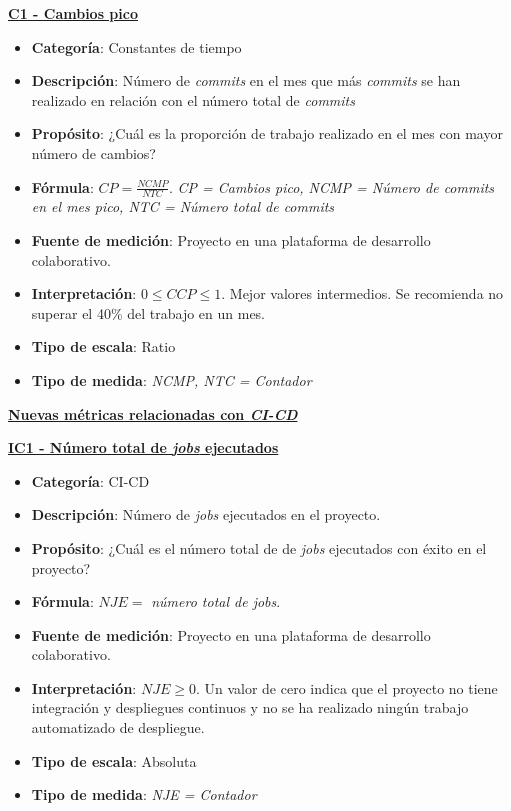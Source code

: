 \textbf{\underline{C1 - Cambios pico}}

\begin{itemize}
	\item \textbf{Categoría}: Constantes de tiempo
	\item \textbf{Descripción}: Número de \textit{commits} en el mes que más \textit{commits} se han realizado en relación con el número total de \textit{commits}
	\item \textbf{Propósito}: ¿Cuál es la proporción de trabajo realizado en el mes con mayor número de cambios?
	\item \textbf{Fórmula}: $CP = \frac{NCMP}{NTC}$. \textit{CP = Cambios pico, NCMP = Número de \textit{commits} en el mes pico, NTC = Número total de \textit{commits}}
	\item \textbf{Fuente de medición}: Proyecto en una plataforma de desarrollo colaborativo.
	\item \textbf{Interpretación}: $0 \leq CCP \leq 1$. Mejor valores intermedios. Se recomienda no superar el 40\% del trabajo en un mes.
	\item \textbf{Tipo de escala}: Ratio
	\item \textbf{Tipo de medida}: \textit{NCMP, NTC = Contador}
\end{itemize}

\begin{large}
\textbf{\underline{Nuevas métricas relacionadas con \textit{CI-CD}}}
\linebreak
\end{large}

\textbf{\underline{IC1 - Número total de \textit{jobs} ejecutados}}
\begin{itemize}
	\item \textbf{Categoría}: CI-CD
	\item \textbf{Descripción}: Número de \textit{jobs} ejecutados en el proyecto.
	\item \textbf{Propósito}: ¿Cuál es el número total de de \textit{jobs} ejecutados con éxito en el proyecto?
	\item \textbf{Fórmula}: $NJE =$ \textit{número total de jobs}.
	\item \textbf{Fuente de medición}: Proyecto en una plataforma de desarrollo colaborativo.
	\item \textbf{Interpretación}: $NJE \geq 0$. Un valor de cero indica que el proyecto no tiene integración y despliegues continuos y no se ha realizado ningún trabajo automatizado de despliegue.
	\item \textbf{Tipo de escala}: Absoluta
	\item \textbf{Tipo de medida}: \textit{NJE = Contador}
\end{itemize}

